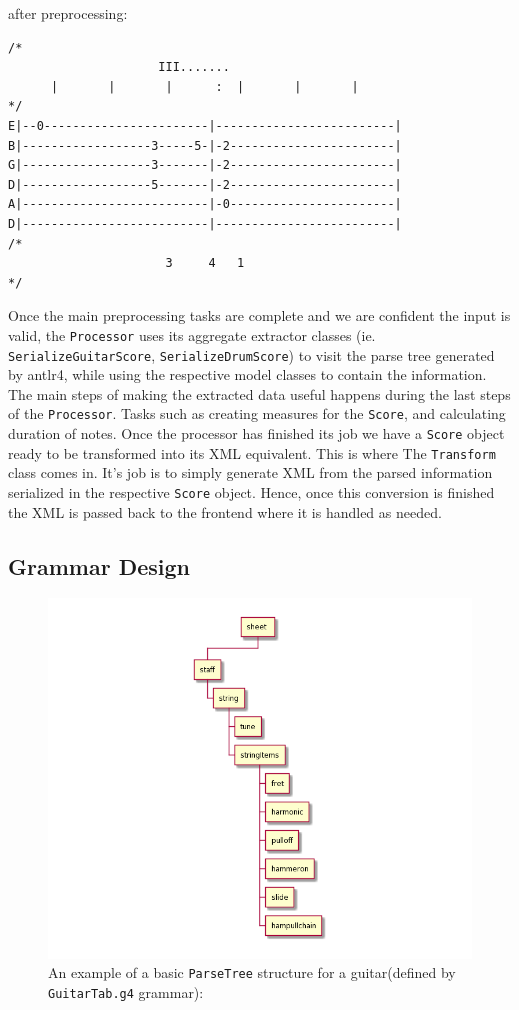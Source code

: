 \documentclass[11pt]{article}
\begin{document}
after preprocessing:
\begin{verbatim}
/*
	                 III.......
	  |       |       |      :  |       |       |
*/
E|--0-----------------------|-------------------------|
B|------------------3-----5-|-2-----------------------|
G|------------------3-------|-2-----------------------|
D|------------------5-------|-2-----------------------|
A|--------------------------|-0-----------------------|
D|--------------------------|-------------------------|
/*
	                  3     4   1
*/
\end{verbatim}

Once the main preprocessing tasks are complete and we are confident the input is valid, the \texttt{Processor} uses its aggregate extractor classes (ie. \texttt{SerializeGuitarScore}, \texttt{SerializeDrumScore}) to visit the parse tree generated by antlr4, while using the respective model classes to contain the information. The main steps of making the extracted data useful happens during the last steps of the \texttt{Processor}. Tasks such as creating measures for the \texttt{Score}, and calculating duration of notes. Once the processor has finished its job we have a \texttt{Score} object ready to be transformed into its XML equivalent. This is where The \texttt{Transform} class comes in. It's job is to simply generate XML from the parsed information serialized in the respective \texttt{Score} object. Hence, once this conversion is finished the XML is passed back to the frontend where it is handled as needed.

\newpage
\subsection{Grammar Design}
\label{sec:org07b7b69}
\begin{figure}[htbp]
\centering
\includegraphics[width=.9\linewidth]{./Diagrams/backend-guitar-grammar-diagram.png}
\caption{An example of a basic \texttt{ParseTree} structure for a guitar(defined by \texttt{GuitarTab.g4} grammar):}
\end{figure}
\end{document}
